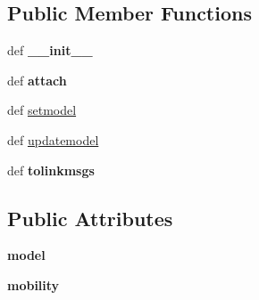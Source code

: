 \subsection*{Public Member Functions}
\begin{DoxyCompactItemize}
\item 
\hypertarget{classcore_1_1netns_1_1nodes_1_1_wlan_node_a826c30717e70edb498894a40c355ca28}{def {\bfseries \+\_\+\+\_\+init\+\_\+\+\_\+}}\label{classcore_1_1netns_1_1nodes_1_1_wlan_node_a826c30717e70edb498894a40c355ca28}

\item 
\hypertarget{classcore_1_1netns_1_1nodes_1_1_wlan_node_ab6f5b4aa0907852302a191cc92966ea4}{def {\bfseries attach}}\label{classcore_1_1netns_1_1nodes_1_1_wlan_node_ab6f5b4aa0907852302a191cc92966ea4}

\item 
def \hyperlink{classcore_1_1netns_1_1nodes_1_1_wlan_node_ac6bd9da95f6f33874a0d55603e3ba9f5}{setmodel}
\item 
def \hyperlink{classcore_1_1netns_1_1nodes_1_1_wlan_node_ab2b8f571ad9f87d47df971a6f080853a}{updatemodel}
\item 
\hypertarget{classcore_1_1netns_1_1nodes_1_1_wlan_node_a943fadf0aab9d07b2d0dfcc51ad4221b}{def {\bfseries tolinkmsgs}}\label{classcore_1_1netns_1_1nodes_1_1_wlan_node_a943fadf0aab9d07b2d0dfcc51ad4221b}

\end{DoxyCompactItemize}
\subsection*{Public Attributes}
\begin{DoxyCompactItemize}
\item 
\hypertarget{classcore_1_1netns_1_1nodes_1_1_wlan_node_af7a663507bedb4fcd847a0d2f18360cf}{{\bfseries model}}\label{classcore_1_1netns_1_1nodes_1_1_wlan_node_af7a663507bedb4fcd847a0d2f18360cf}

\item 
\hypertarget{classcore_1_1netns_1_1nodes_1_1_wlan_node_aedcd913c6ba2258845241c7ec8ea8b52}{{\bfseries mobility}}\label{classcore_1_1netns_1_1nodes_1_1_wlan_node_aedcd913c6ba2258845241c7ec8ea8b52}

\end{DoxyCompactItemize}
